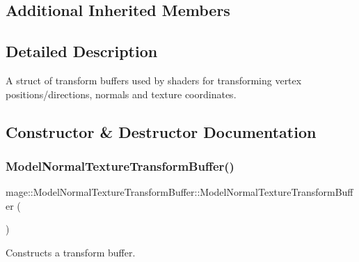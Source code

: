 \subsection*{Additional Inherited Members}


\subsection{Detailed Description}
A struct of transform buffers used by shaders for transforming vertex positions/directions, normals and texture coordinates. 

\subsection{Constructor \& Destructor Documentation}
\hypertarget{structmage_1_1_model_normal_texture_transform_buffer_ad419df3f0977a4d9185489c19e2237b6}{}\label{structmage_1_1_model_normal_texture_transform_buffer_ad419df3f0977a4d9185489c19e2237b6} 
\subsubsection{\texorpdfstring{Model\+Normal\+Texture\+Transform\+Buffer()}{ModelNormalTextureTransformBuffer()}\hspace{0.1cm}{\footnotesize\ttfamily [1/3]}}
{\footnotesize\ttfamily mage\+::\+Model\+Normal\+Texture\+Transform\+Buffer\+::\+Model\+Normal\+Texture\+Transform\+Buffer (\begin{DoxyParamCaption}{ }\end{DoxyParamCaption})}

Constructs a transform buffer. \hypertarget{structmage_1_1_model_normal_texture_transform_buffer_abf62d5e6d36c5a012907933d9f5cdcd8}{}\label{structmage_1_1_model_normal_texture_transform_buffer_abf62d5e6d36c5a012907933d9f5cdcd8} 
